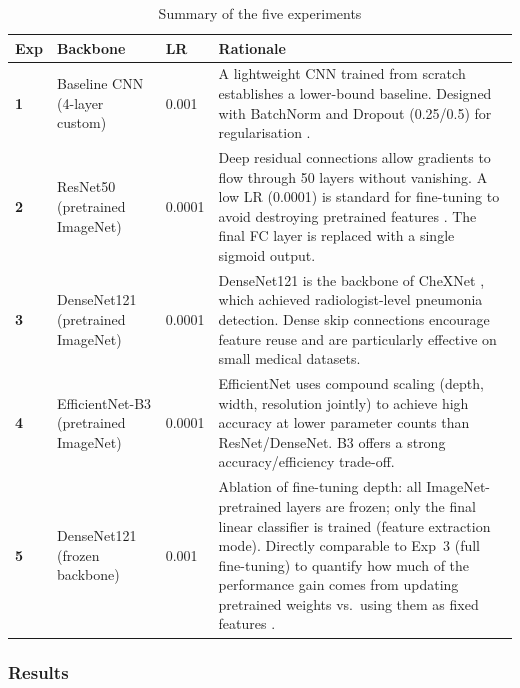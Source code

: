 \documentclass[11pt,a4paper]{article}
\begin{document}
\begin{table}[H]
\centering
\caption{Summary of the five experiments}
\label{tab:experiments}
\renewcommand{\arraystretch}{1.4}
\begin{tabular}{>{\bfseries}p{0.5cm} p{3cm} p{2cm} p{7.5cm}}
\toprule
\textbf{Exp} & \textbf{Backbone} & \textbf{LR} & \textbf{Rationale} \\
\midrule
1 & Baseline CNN (4-layer custom) & 0.001 &
    A lightweight CNN trained from scratch establishes a lower-bound baseline.
    Designed with BatchNorm and Dropout (0.25/0.5) for regularisation
    \cite{lecun1998gradient}. \\

2 & ResNet50 \cite{he2016deep} (pretrained ImageNet) & 0.0001 &
    Deep residual connections allow gradients to flow through 50 layers without
    vanishing. A low LR (0.0001) is standard for fine-tuning to avoid
    destroying pretrained features \cite{yosinski2014transferable}.
    The final FC layer is replaced with a single sigmoid output. \\

3 & DenseNet121 \cite{huang2017densely} (pretrained ImageNet) & 0.0001 &
    DenseNet121 is the backbone of CheXNet \cite{rajpurkar2017chexnet}, which
    achieved radiologist-level pneumonia detection. Dense skip connections
    encourage feature reuse and are particularly effective on small medical
    datasets. \\

4 & EfficientNet-B3 \cite{tan2019efficientnet} (pretrained ImageNet) & 0.0001 &
    EfficientNet uses compound scaling (depth, width, resolution jointly) to
    achieve high accuracy at lower parameter counts than ResNet/DenseNet.
    B3 offers a strong accuracy/efficiency trade-off. \\

5 & DenseNet121 \cite{huang2017densely} (frozen backbone) & 0.001 &
    Ablation of fine-tuning depth: all ImageNet-pretrained layers are frozen;
    only the final linear classifier is trained (feature extraction mode).
    Directly comparable to Exp~3 (full fine-tuning) to quantify how much of
    the performance gain comes from updating pretrained weights vs.\ using
    them as fixed features \cite{yosinski2014transferable}. \\
\bottomrule
\end{tabular}
\end{table}

\subsubsection{Results}
\end{document}
